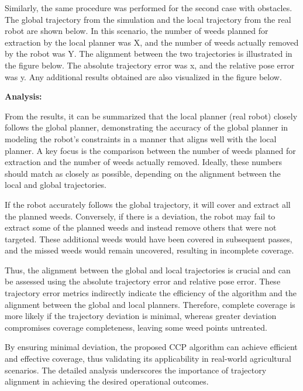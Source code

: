 \vspace*{6mm}   


Similarly, the same procedure was performed for the second case with obstacles. The global trajectory from the simulation and the local trajectory from the real robot are shown below. In this scenario, the number of weeds planned for extraction by the local planner was X, and the number of weeds actually removed by the robot was Y. The alignment between the two trajectories is illustrated in the figure below. The absolute trajectory error was x, and the relative pose error was y. Any additional results obtained are also visualized in the figure below.

\vspace*{6mm}   


\textbf{Analysis: }

From the results, it can be summarized that the local planner (real robot) closely follows the global planner, demonstrating the accuracy of the global planner in modeling the robot's constraints in a manner that aligns well with the local planner. A key focus is the comparison between the number of weeds planned for extraction and the number of weeds actually removed. Ideally, these numbers should match as closely as possible, depending on the alignment between the local and global trajectories.

\vspace*{6mm}   

If the robot accurately follows the global trajectory, it will cover and extract all the planned weeds. Conversely, if there is a deviation, the robot may fail to extract some of the planned weeds and instead remove others that were not targeted. These additional weeds would have been covered in subsequent passes, and the missed weeds would remain uncovered, resulting in incomplete coverage.

\vspace*{6mm}   

Thus, the alignment between the global and local trajectories is crucial and can be assessed using the absolute trajectory error and relative pose error. These trajectory error metrics indirectly indicate the efficiency of the algorithm and the alignment between the global and local planners. Therefore, complete coverage is more likely if the trajectory deviation is minimal, whereas greater deviation compromises coverage completeness, leaving some weed points untreated.

\vspace*{6mm}   

By ensuring minimal deviation, the proposed CCP algorithm can achieve efficient and effective coverage, thus validating its applicability in real-world agricultural scenarios. The detailed analysis underscores the importance of trajectory alignment in achieving the desired operational outcomes.

\vspace*{6mm}  
